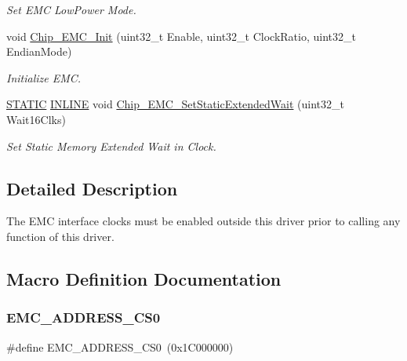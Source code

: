 \begin{DoxyCompactItemize}
\begin{DoxyCompactList}\small\item\em Set E\+MC Low\+Power Mode. \end{DoxyCompactList}\item 
void \hyperlink{group___e_m_c__18_x_x__43_x_x_ga96af5cbd177432e40c687097f5453480}{Chip\+\_\+\+E\+M\+C\+\_\+\+Init} (uint32\+\_\+t Enable, uint32\+\_\+t Clock\+Ratio, uint32\+\_\+t Endian\+Mode)
\begin{DoxyCompactList}\small\item\em Initialize E\+MC. \end{DoxyCompactList}\item 
\hyperlink{group___l_p_c___types___public___macros_ga10b2d890d871e1489bb02b7e70d9bdfb}{S\+T\+A\+T\+IC} \hyperlink{spifi__18xx__43xx_8h_a2eb6f9e0395b47b8d5e3eeae4fe0c116}{I\+N\+L\+I\+NE} void \hyperlink{group___e_m_c__18_x_x__43_x_x_ga6584bd99794783f75a176b8ee3b2cbc9}{Chip\+\_\+\+E\+M\+C\+\_\+\+Set\+Static\+Extended\+Wait} (uint32\+\_\+t Wait16\+Clks)
\begin{DoxyCompactList}\small\item\em Set Static Memory Extended Wait in Clock. \end{DoxyCompactList}\end{DoxyCompactItemize}


\subsection{Detailed Description}
The E\+MC interface clocks must be enabled outside this driver prior to calling any function of this driver. 

\subsection{Macro Definition Documentation}
\mbox{\label{group___e_m_c__18_x_x__43_x_x_ga128f03ce6dd1a7f821d0ab1a53e11ac4}} 
\subsubsection{\texorpdfstring{E\+M\+C\+\_\+\+A\+D\+D\+R\+E\+S\+S\+\_\+\+C\+S0}{EMC\_ADDRESS\_CS0}}
{\footnotesize\ttfamily \#define E\+M\+C\+\_\+\+A\+D\+D\+R\+E\+S\+S\+\_\+\+C\+S0~(0x1\+C000000)}

